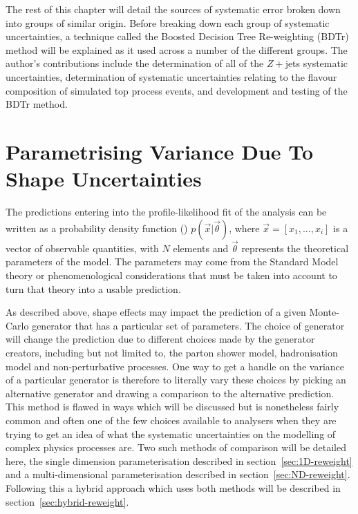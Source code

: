 The rest of this chapter will detail the sources of systematic error broken down
into groups of similar origin. Before breaking down each group of systematic
uncertainties, a technique called the Boosted Decision Tree Re-weighting (BDTr)
method will be explained as it used across a number of the different groups. The
author's contributions include the determination of all of the $Z+$jets
systematic uncertainties, determination of systematic uncertainties relating to
the flavour composition of simulated top process events, and development and
testing of the BDTr method.

\section{Parametrising Variance Due To Shape Uncertainties}
\label{sec:re-weighting}

The predictions entering into the profile-likelihood fit of the analysis can be
written as a probability density function (\PDF) $p(\vec{x}|\vec{\theta})$,
where $\vec{x} = [x_{1},..., x_{i}]$ is a vector of observable quantities, with
$N$ elements and $\vec{\theta}$ represents the theoretical parameters of the
model. The parameters may come from the Standard Model theory or
phenomenological considerations that must be taken into account to turn that
theory into a usable prediction.

As described above, shape effects may impact the prediction of a given
Monte-Carlo generator that has a particular set of parameters. The choice of
generator will change the prediction due to different choices made by the
generator creators, including but not limited to, the parton shower model,
hadronisation model and non-perturbative processes. One way to get a handle on
the variance of a particular generator is therefore to literally vary these
choices by picking an alternative generator and drawing a comparison to the
alternative prediction. This method is flawed in ways which will be discussed
but is nonetheless fairly common and often one of the few choices available to
analysers when they are trying to get an idea of what the systematic
uncertainties on the modelling of complex physics processes are. Two such
methods of comparison will be detailed here, the single dimension
parameterisation described in section~\ref{sec:1D-reweight} and a
multi-dimensional parameterisation described in section~\ref{sec:ND-reweight}.
Following this a hybrid approach which uses both methods will be described in
section~\ref{sec:hybrid-reweight}.

